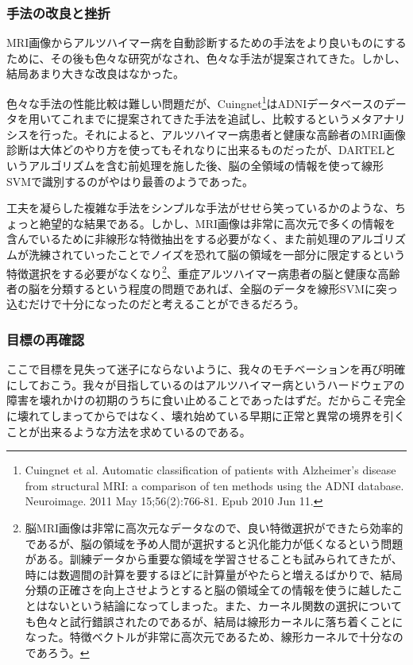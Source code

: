 \subsubsection{手法の改良と挫折}
MRI画像からアルツハイマー病を自動診断するための手法をより良いものにするために、その後も色々な研究がなされ、色々な手法が提案されてきた。しかし、結局あまり大きな改良はなかった。

色々な手法の性能比較は難しい問題だが、Cuingnet\footnote{Cuingnet et al. Automatic classification of patients with Alzheimer's disease from structural MRI: a comparison of ten methods using the ADNI database. Neuroimage. 2011 May 15;56(2):766-81. Epub 2010 Jun 11.}はADNIデータベースのデータを用いてこれまでに提案されてきた手法を追試し、比較するというメタアナリシスを行った。それによると、アルツハイマー病患者と健康な高齢者のMRI画像診断は大体どのやり方を使ってもそれなりに出来るものだったが、DARTELというアルゴリズムを含む前処理を施した後、脳の全領域の情報を使って線形SVMで識別するのがやはり最善のようであった。

工夫を凝らした複雑な手法をシンプルな手法がせせら笑っているかのような、ちょっと絶望的な結果である。しかし、MRI画像は非常に高次元で多くの情報を含んでいるために非線形な特徴抽出をする必要がなく、また前処理のアルゴリズムが洗練されていったことでノイズを恐れて脳の領域を一部分に限定するという特徴選択をする必要がなくなり\footnote{脳MRI画像は非常に高次元なデータなので、良い特徴選択ができたら効率的であるが、脳の領域を予め人間が選択すると汎化能力が低くなるという問題がある。訓練データから重要な領域を学習させることも試みられてきたが、時には数週間の計算を要するほどに計算量がやたらと増えるばかりで、結局分類の正確さを向上させようとすると脳の領域全ての情報を使うに越したことはないという結論になってしまった。また、カーネル関数の選択についても色々と試行錯誤されたのであるが、結局は線形カーネルに落ち着くことになった。特徴ベクトルが非常に高次元であるため、線形カーネルで十分なのであろう。}、重症アルツハイマー病患者の脳と健康な高齢者の脳を分類するという程度の問題であれば、全脳のデータを線形SVMに突っ込むだけで十分になったのだと考えることができるだろう。

\subsubsection{目標の再確認}
ここで目標を見失って迷子にならないように、我々のモチベーションを再び明確にしておこう。我々が目指しているのはアルツハイマー病というハードウェアの障害を壊れかけの初期のうちに食い止めることであったはずだ。だからこそ完全に壊れてしまってからではなく、壊れ始めている早期に正常と異常の境界を引くことが出来るような方法を求めているのである。

